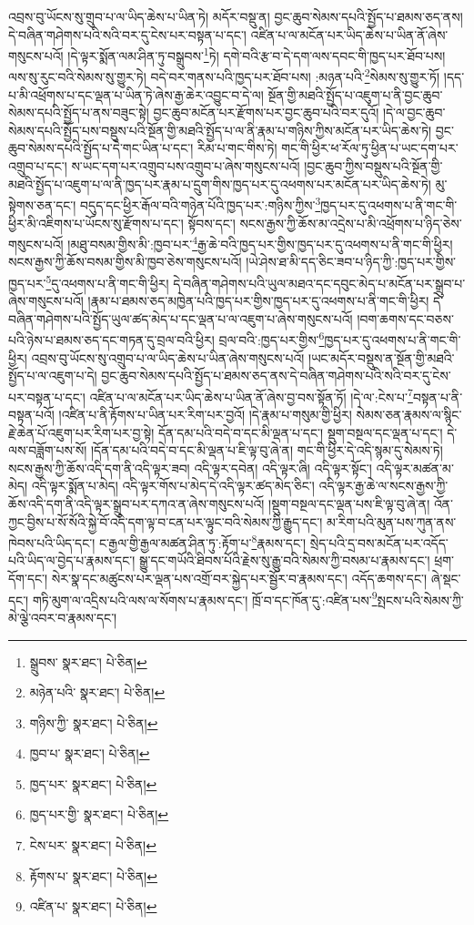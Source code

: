 འབྲས་བུ་ཡོངས་སུ་གྲུབ་པ་ལ་ཡིད་ཆེས་པ་ཡིན་ཏེ། མདོར་བསྡུ་ན། བྱང་ཆུབ་སེམས་དཔའི་སྤྱོད་པ་ཐམས་ཅད་ནས། དེ་བཞིན་གཤེགས་པའི་སའི་བར་དུ་ངེས་པར་བསྟན་པ་དང་། འཛིན་པ་ལ་མངོན་པར་ཡིད་ཆེས་པ་ཡིན་ནོ་ཞེས་གསུངས་པའོ། །དེ་ལྟར་སྨོན་ལམ་ཤིན་ཏུ་བསྒྲུབས་\footnote{སྒྲུབས་  སྣར་ཐང་།  པེ་ཅིན། }ཏེ། དགེ་བའི་རྩ་བ་དེ་དག་ལས་དབང་གི་ཁྱད་པར་ཐོབ་པས། ལས་སུ་རུང་བའི་སེམས་སུ་གྱུར་ཏེ། བདེ་བར་གནས་པའི་ཁྱད་པར་ཐོབ་པས། :མཉན་པའི་\footnote{མཉེན་པའི་  སྣར་ཐང་།  པེ་ཅིན། }སེམས་སུ་གྱུར་ཏོ། །དད་པ་མི་འཕྲོགས་པ་དང་ལྡན་པ་ཡིན་ཏེ་ཞེས་རྒྱ་ཆེར་འབྱུང་བ་དེ་ལ། སྔོན་གྱི་མཐའི་སྤྱོད་པ་འཇུག་པ་ནི་བྱང་ཆུབ་སེམས་དཔའི་སྤྱོད་པ་ནས་བཟུང་སྟེ། བྱང་ཆུབ་མངོན་པར་རྫོགས་པར་བྱང་ཆུབ་པའི་བར་དུའོ། །དེ་ལ་བྱང་ཆུབ་སེམས་དཔའི་སྤྱོད་པས་བསྡུས་པའི་སྔོན་གྱི་མཐའི་སྤྱོད་པ་ལ་ནི་རྣམ་པ་གཉིས་ཀྱིས་མངོན་པར་ཡིད་ཆེས་ཏེ། བྱང་ཆུབ་སེམས་དཔའི་སྤྱོད་པ་དེ་གང་ཡིན་པ་དང་། རིམ་པ་གང་གིས་ཏེ། གང་གི་ཕྱིར་ཕ་རོལ་ཏུ་ཕྱིན་པ་ཡང་དག་པར་འགྲུབ་པ་དང་། ས་ཡང་དག་པར་འགྲུབ་པས་འགྲུབ་པ་ཞེས་གསུངས་པའོ། །བྱང་ཆུབ་ཀྱིས་བསྡུས་པའི་སྔོན་གྱི་མཐའི་སྤྱོད་པ་འཇུག་པ་ལ་ནི་ཁྱད་པར་རྣམ་པ་དྲུག་གིས་ཁྱད་པར་དུ་འཕགས་པར་མངོན་པར་ཡིད་ཆེས་ཏེ། མུ་སྟེགས་ཅན་དང་། བདུད་དང་ཕྱིར་རྒོལ་བའི་གཉེན་པོའི་ཁྱད་པར་:གཉིས་ཀྱིས་\footnote{གཉིས་ཀྱི་  སྣར་ཐང་།  པེ་ཅིན། }ཁྱད་པར་དུ་འཕགས་པ་ནི་གང་གི་ཕྱིར་མི་འཇིགས་པ་ཡོངས་སུ་རྫོགས་པ་དང་། སྟོབས་དང་། སངས་རྒྱས་ཀྱི་ཆོས་མ་འདྲེས་པ་མི་འཕྲོགས་པ་ཉིད་ཅེས་གསུངས་པའོ། །མཐུ་བསམ་གྱིས་མི་:ཁྱབ་པར་\footnote{ཁྱབ་པ་  སྣར་ཐང་།  པེ་ཅིན། }རྒྱ་ཆེ་བའི་ཁྱད་པར་གྱིས་ཁྱད་པར་དུ་འཕགས་པ་ནི་གང་གི་ཕྱིར། སངས་རྒྱས་ཀྱི་ཆོས་བསམ་གྱིས་མི་ཁྱབ་ཅེས་གསུངས་པའོ། །ཡེ་ཤེས་ཐ་མི་དད་ཅིང་ཟབ་པ་ཉིད་ཀྱི་:ཁྱད་པར་གྱིས་ཁྱད་པར་\footnote{ཁྱད་པར་  སྣར་ཐང་།  པེ་ཅིན། }དུ་འཕགས་པ་ནི་གང་གི་ཕྱིར། དེ་བཞིན་གཤེགས་པའི་ཡུལ་མཐའ་དང་དབུང་མེད་པ་མངོན་པར་སྒྲུབ་པ་ཞེས་གསུངས་པའོ། །རྣམ་པ་ཐམས་ཅད་མཁྱེན་པའི་ཁྱད་པར་གྱིས་ཁྱད་པར་དུ་འཕགས་པ་ནི་གང་གི་ཕྱིར། དེ་བཞིན་གཤེགས་པའི་སྤྱོད་ཡུལ་ཚད་མེད་པ་དང་ལྡན་པ་ལ་འཇུག་པ་ཞེས་གསུངས་པའོ། །བག་ཆགས་དང་བཅས་པའི་ཉེས་པ་ཐམས་ཅད་དང་གཏན་དུ་བྲལ་བའི་ཕྱིར། བྲལ་བའི་:ཁྱད་པར་གྱིས་\footnote{ཁྱད་པར་གྱི་  སྣར་ཐང་།  པེ་ཅིན། }ཁྱད་པར་དུ་འཕགས་པ་ནི་གང་གི་ཕྱིར། འབྲས་བུ་ཡོངས་སུ་འགྲུབ་པ་ལ་ཡིད་ཆེས་པ་ཡིན་ཞེས་གསུངས་པའོ། །ཡང་མདོར་བསྡུས་ན་སྔོན་གྱི་མཐའི་སྤྱོད་པ་ལ་འཇུག་པ་དེ། བྱང་ཆུབ་སེམས་དཔའི་སྤྱོད་པ་ཐམས་ཅད་ནས་དེ་བཞིན་གཤེགས་པའི་སའི་བར་དུ་ངེས་པར་བསྟན་པ་དང་། འཛིན་པ་ལ་མངོན་པར་ཡིད་ཆེས་པ་ཡིན་ནོ་ཞེས་བྱ་བས་སྟོན་ཏོ། །དེ་ལ་:ངེས་པ་\footnote{ངེས་པར་  སྣར་ཐང་།  པེ་ཅིན། }བསྟན་པ་ནི་བསྟན་པའོ། །འཛིན་པ་ནི་རྟོགས་པ་ཡིན་པར་རིག་པར་བྱའོ། །དེ་རྣམ་པ་གསུམ་གྱི་ཕྱིར། སེམས་ཅན་རྣམས་ལ་སྙིང་རྗེ་ཆེན་པོ་འཇུག་པར་རིག་པར་བྱ་སྟེ། དོན་དམ་པའི་བདེ་བ་དང་མི་ལྡན་པ་དང་། སྡུག་བསྔལ་དང་ལྡན་པ་དང་། དེ་ལས་བཟློག་པས་སོ། །དོན་དམ་པའི་བདེ་བ་དང་མི་ལྡན་པ་ཇི་ལྟ་བུ་ཞེ་ན། གང་གི་ཕྱིར་དེ་འདི་སྙམ་དུ་སེམས་ཏེ། སངས་རྒྱས་ཀྱི་ཆོས་འདི་དག་ནི་འདི་ལྟར་ཟབ། འདི་ལྟར་དབེན། འདི་ལྟར་ཞི། འདི་ལྟར་སྟོང་། འདི་ལྟར་མཚན་མ་མེད། འདི་ལྟར་སྨོན་པ་མེད། འདི་ལྟར་གོས་པ་མེད་དེ་འདི་ལྟར་ཚད་མེད་ཅིང་། འདི་ལྟར་རྒྱ་ཆེ་ལ་སངས་རྒྱས་ཀྱི་ཆོས་འདི་དག་ནི་འདི་ལྟར་སྒྲུབ་པར་དཀའ་ན་ཞེས་གསུངས་པའོ། །སྡུག་བསྔལ་དང་ལྡན་པས་ཇི་ལྟ་བུ་ཞེ་ན། འོན་ཀྱང་བྱིས་པ་སོ་སོའི་སྐྱེ་བོ་འདི་དག་ལྟ་བ་ངན་པར་ལྟུང་བའི་སེམས་ཀྱི་རྒྱུད་དང་། མ་རིག་པའི་མུན་པས་ཀུན་ནས་ཁེབས་པའི་ཡིད་དང་། ང་རྒྱལ་གྱི་རྒྱལ་མཚན་ཤིན་ཏུ་:རྟོག་པ་\footnote{རྟོགས་པ་  སྣར་ཐང་།  པེ་ཅིན། }རྣམས་དང་། སྲེད་པའི་དྲ་བས་མངོན་པར་འདོད་པའི་ཡིད་ལ་བྱེད་པ་རྣམས་དང་། སྒྱུ་དང་གཡོའི་ཐིབས་པོའི་རྗེས་སུ་རྒྱུ་བའི་སེམས་ཀྱི་བསམ་པ་རྣམས་དང་། ཕྲག་དོག་དང་། སེར་སྣ་དང་མཚུངས་པར་ལྡན་པས་འགྲོ་བར་སྐྱེད་པར་སྦྱོར་བ་རྣམས་དང་། འདོད་ཆགས་དང་། ཞེ་སྡང་དང་། གཏི་མུག་ལ་འདྲིས་པའི་ལས་ལ་སོགས་པ་རྣམས་དང་། ཁྲོ་བ་དང་ཁོན་དུ་:འཛིན་པས་\footnote{འཛིན་པ་  སྣར་ཐང་།  པེ་ཅིན། }སྤངས་པའི་སེམས་ཀྱི་མེ་ལྕེ་འབར་བ་རྣམས་དང་། 